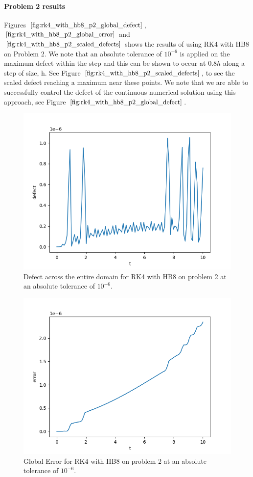\paragraph{Problem 2 results}
Figures $\ref{fig:rk4_with_hb8_p2_global_defect}$, $\ref{fig:rk4_with_hb8_p2_global_error}$ and $\ref{fig:rk4_with_hb8_p2_scaled_defects}$ shows the results of using RK4 with HB8 on Problem 2. We note that an absolute tolerance of $10^{-6}$ is applied on the maximum defect within the step and this can be shown to occur at $0.8h$ along a step of size, h. See Figure $\ref{fig:rk4_with_hb8_p2_scaled_defects}$, to see the scaled defect reaching a maximum near these points. We note that we are able to successfully control the defect of the continuous numerical solution using this approach, see Figure $\ref{fig:rk4_with_hb8_p2_global_defect}$. 

\begin{figure}[H]
\centering
\includegraphics[width=0.7\linewidth]{./figures/rk4_with_hb8_p2_global_defect}
\caption{Defect across the entire domain for RK4 with HB8 on problem 2 at an absolute tolerance of $10^{-6}$.}
\label{fig:rk4_with_hb8_p2_global_defect}
\end{figure}

\begin{figure}[H]
\centering
\includegraphics[width=0.7\linewidth]{./figures/rk4_with_hb8_p2_global_error}
\caption{Global Error for RK4 with HB8 on problem 2 at an absolute tolerance of $10^{-6}$.}
\label{fig:rk4_with_hb8_p2_global_error}
\end{figure}

